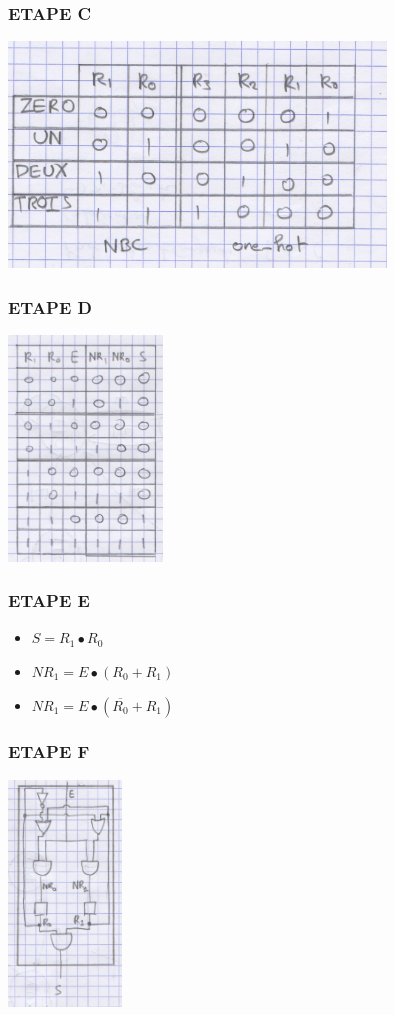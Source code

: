 \documentclass[10pt]{article}
\begin{document}
\subsubsection{ETAPE C}
  \begin{center}
    \includegraphics[height=6cm]{./pics/truthtable.png}
  \end{center}

\subsubsection{ETAPE D}
  \begin{center}
    \includegraphics[height=6cm]{./pics/equationtable.png}
  \end{center}

\subsubsection{ETAPE E}
\begin{itemize}
  \item \(S=R_1 \bullet R_0\)
  \item \(NR_1 = E \bullet {(R_0 + R_1)}\)
  \item \(NR_1 = E \bullet {(\overline{R_0} + R_1)}\)
\end{itemize}

\subsubsection{ETAPE F}
  \begin{center}
    \includegraphics[height=6cm]{./pics/circuit.png}
  \end{center}
\end{document}
